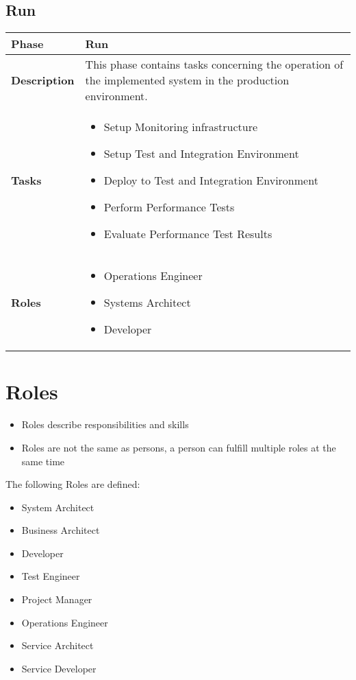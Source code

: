 \subsection{Run}
\begin{minipage}{\textwidth}
\label{table:ch6_View_Run}
\begin{tabular}
	{|m{2cm}|m{10cm}|} \hline \bfseries Phase & Run\\
	\hline \bfseries Description & This phase contains tasks concerning the operation of the implemented system in the production environment. \\
	\hline \bfseries Tasks & 
	\begin{itemize}
		\item Setup Monitoring infrastructure
		\item Setup Test and Integration Environment
		\item Deploy to Test and Integration Environment
		\item Perform Performance Tests
		\item Evaluate Performance Test Results
	\end{itemize}
	\\
	\hline \bfseries Roles &
	\begin{itemize}
		\item Operations Engineer
		\item Systems Architect
		\item Developer
	\end{itemize}
	\\
	\hline 
\end{tabular}
\end{minipage}

\section{Roles} 

\begin{itemize}
	\item Roles describe responsibilities and skills
	\item Roles are not the same as persons, a person can fulfill multiple roles at the same time
\end{itemize}

The following Roles are defined:
\begin{itemize}
	\item System Architect 
	\item Business Architect
	\item Developer
	\item Test Engineer
	\item Project Manager
	\item Operations Engineer 
	\item Service Architect 
	\item Service Developer
\end{itemize}


